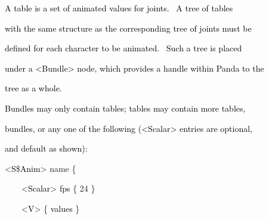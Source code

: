 \documentclass[a4paper]{article}
\newcommand\textstyleOOoComputerKeyWord[1]{\textrm{\textcolor[rgb]{0.0,0.0,0.5019608}{#1}}}
\newcommand\textstyleOOoAssemblerSpecialChar[1]{\textrm{\textcolor[rgb]{0.0,0.5019608,0.0}{#1}}}
\newcommand\textstyleOOoAssemblerIdent[1]{\textrm{\textcolor{black}{#1}}}
\newcommand\textstyleOOoAssemblerDirective[1]{\textrm{\textcolor[rgb]{0.0,0.5019608,1.0}{#1}}}
\newcommand\textstyleOOoAssemblerLiteral[1]{\textrm{\textcolor[rgb]{0.49803922,0.0,0.49803922}{#1}}}
\begin{document}
\bigskip

{\color{black}
\textstyleOOoComputerKeyWord{\textcolor{black}{\ \ A table is a set of animated values for joints. \ A tree of tables}}}

{\color{black}
\textstyleOOoComputerKeyWord{\textcolor{black}{\ \ with the same structure as the corresponding tree of joints must
be}}}

{\color{black}
\textstyleOOoComputerKeyWord{\textcolor{black}{\ \ defined for each character to be animated. \ Such a tree is placed}}}

{\color{black}
\textstyleOOoComputerKeyWord{\textcolor{black}{\ \ under a {\textless}Bundle{\textgreater} node, which provides a handle
within Panda to the}}}

{\color{black}
\textstyleOOoComputerKeyWord{\textcolor{black}{\ \ tree as a whole.}}}

{\color{black}
\textstyleOOoComputerKeyWord{\textcolor{black}{\ \ Bundles may only contain tables; tables may contain more tables,}}}

{\color{black}
\textstyleOOoComputerKeyWord{\textcolor{black}{\ \ bundles, or any one of the following ({\textless}Scalar{\textgreater}
entries are optional,}}}

{\color{black}
\textstyleOOoComputerKeyWord{\textcolor{black}{\ \ and default as shown):}}}


\bigskip

{\color{black}
\textstyleOOoComputerKeyWord{\textcolor{black}{\ \ }}\textstyleOOoAssemblerSpecialChar{{\textless}}\textstyleOOoAssemblerIdent{S}\textstyleOOoAssemblerSpecialChar{\$}\textstyleOOoAssemblerIdent{Anim}\textstyleOOoAssemblerSpecialChar{{\textgreater}}\textstyleOOoComputerKeyWord{\textcolor{black}{
}}\textstyleOOoAssemblerDirective{name}\textstyleOOoComputerKeyWord{\textcolor{black}{
}}\textstyleOOoAssemblerSpecialChar{\{}\textstyleOOoComputerKeyWord{\textcolor{black}{ }}}

{\color{black}
\textstyleOOoComputerKeyWord{\textcolor{black}{\ \ \ \ \ \ }}\textstyleOOoAssemblerSpecialChar{{\textless}}\textstyleOOoAssemblerIdent{Scalar}\textstyleOOoAssemblerSpecialChar{{\textgreater}}\textstyleOOoComputerKeyWord{\textcolor{black}{
}}\textstyleOOoAssemblerIdent{fps}\textstyleOOoComputerKeyWord{\textcolor{black}{
}}\textstyleOOoAssemblerSpecialChar{\{}\textstyleOOoComputerKeyWord{\textcolor{black}{
}}\textstyleOOoAssemblerLiteral{24}\textstyleOOoComputerKeyWord{\textcolor{black}{
}}\textstyleOOoAssemblerSpecialChar{\}}}

{\color{black}
\textstyleOOoComputerKeyWord{\textcolor{black}{\ \ \ \ \ \ }}\textstyleOOoAssemblerSpecialChar{{\textless}}\textstyleOOoAssemblerIdent{V}\textstyleOOoAssemblerSpecialChar{{\textgreater}}\textstyleOOoComputerKeyWord{\textcolor{black}{
}}\textstyleOOoAssemblerSpecialChar{\{}\textstyleOOoComputerKeyWord{\textcolor{black}{
}}\textstyleOOoAssemblerIdent{values}\textstyleOOoComputerKeyWord{\textcolor{black}{
}}\textstyleOOoAssemblerSpecialChar{\}}}
\end{document}
